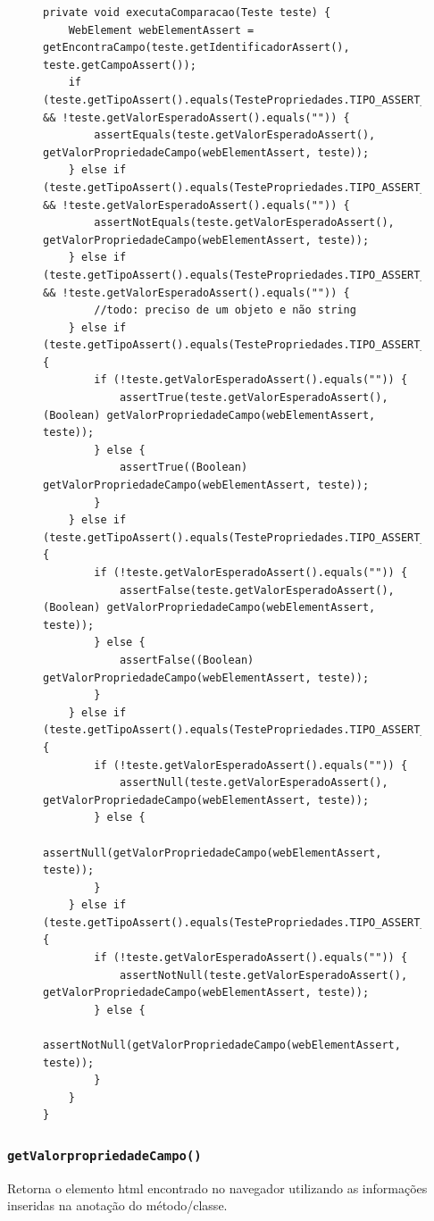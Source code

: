 \documentclass[tg]{mdtufsm}
\begin{document}
\begin{figure}[!htb]
\begin{lstlisting}
private void executaComparacao(Teste teste) {
	WebElement webElementAssert = getEncontraCampo(teste.getIdentificadorAssert(), teste.getCampoAssert());
    if (teste.getTipoAssert().equals(TestePropriedades.TIPO_ASSERT_IGUAL) && !teste.getValorEsperadoAssert().equals("")) {
        assertEquals(teste.getValorEsperadoAssert(), getValorPropriedadeCampo(webElementAssert, teste));
    } else if (teste.getTipoAssert().equals(TestePropriedades.TIPO_ASSERT_DIFERENTE) && !teste.getValorEsperadoAssert().equals("")) {
        assertNotEquals(teste.getValorEsperadoAssert(), getValorPropriedadeCampo(webElementAssert, teste));
    } else if (teste.getTipoAssert().equals(TestePropriedades.TIPO_ASSERT_COLECAO_IGUAL) && !teste.getValorEsperadoAssert().equals("")) {
        //todo: preciso de um objeto e não string
    } else if (teste.getTipoAssert().equals(TestePropriedades.TIPO_ASSERT_VERDADEIRO)) {
        if (!teste.getValorEsperadoAssert().equals("")) {
            assertTrue(teste.getValorEsperadoAssert(), (Boolean) getValorPropriedadeCampo(webElementAssert, teste));
        } else {
            assertTrue((Boolean) getValorPropriedadeCampo(webElementAssert, teste));
        }
    } else if (teste.getTipoAssert().equals(TestePropriedades.TIPO_ASSERT_FALSO)) {
        if (!teste.getValorEsperadoAssert().equals("")) {
            assertFalse(teste.getValorEsperadoAssert(), (Boolean) getValorPropriedadeCampo(webElementAssert, teste));
        } else {
            assertFalse((Boolean) getValorPropriedadeCampo(webElementAssert, teste));
        }
    } else if (teste.getTipoAssert().equals(TestePropriedades.TIPO_ASSERT_NULO)) {
        if (!teste.getValorEsperadoAssert().equals("")) {
            assertNull(teste.getValorEsperadoAssert(), getValorPropriedadeCampo(webElementAssert, teste));
        } else {
            assertNull(getValorPropriedadeCampo(webElementAssert, teste));
        }
    } else if (teste.getTipoAssert().equals(TestePropriedades.TIPO_ASSERT_NAO_NULO)) {
        if (!teste.getValorEsperadoAssert().equals("")) {
            assertNotNull(teste.getValorEsperadoAssert(), getValorPropriedadeCampo(webElementAssert, teste));
        } else {
            assertNotNull(getValorPropriedadeCampo(webElementAssert, teste));
        }
    }
}
\end{lstlisting}
	\label{code:executaComparacao}
\end{figure}

\subsubsection{\texttt{getValorpropriedadeCampo()}}
Retorna o elemento html encontrado no navegador utilizando as informações inseridas na anotação do método/classe.
\end{document}
